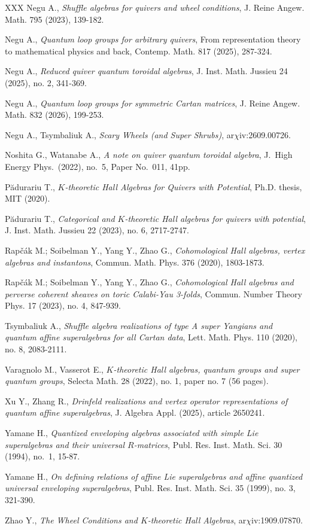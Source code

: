 \documentclass{amsart}
\begin{document}
\begin{thebibliography}{XXX}
Negu A.,
{\em Shuffle algebras for quivers and wheel conditions},
J. Reine Angew. Math. 795 (2023), 139-182.

Negu A.,
{\em Quantum loop groups for arbitrary quivers}, 
From representation theory to mathematical physics and back, Contemp. Math. 817 (2025), 287-324.

Negu A.,
{\em Reduced quiver quantum toroidal algebras},
J. Inst. Math. Jussieu 24 (2025), no. 2, 341-369.

Negu A.,
{\em Quantum loop groups for symmetric Cartan matrices},
J. Reine Angew. Math. 832 (2026), 199-253.

Negu A., Tsymbaliuk A.,
{\em Scary Wheels (and Super Shrubs)},
ar$\chi$iv:2609.00726.

Noshita G., Watanabe A., 
{\em A note on quiver quantum toroidal algebra}, 
J.\ High Energy Phys.\ (2022), no.~5, Paper No.~011, 41pp.

Pădurariu T.,
{\em $K$-theoretic Hall Algebras for Quivers with Potential},
Ph.D. thesis, MIT (2020).

Pădurariu T.,
{\em Categorical and $K$-theoretic Hall algebras for quivers with potential}, 
J. Inst. Math. Jussieu 22 (2023), no. 6, 2717-2747.

Rapčák M.; Soibelman Y., Yang Y., Zhao G.,
{\em Cohomological Hall algebras, vertex algebras and instantons},
Commun. Math. Phys. 376 (2020), 1803-1873.

Rapčák M.; Soibelman Y., Yang Y., Zhao G.,
{\em Cohomological Hall algebras and perverse coherent sheaves on toric Calabi-Yau 3-folds},
Commun. Number Theory Phys.  17 (2023), no. 4, 847-939.

Tsymbaliuk A.,
{\em Shuffle algebra realizations of type A super Yangians and quantum affine superalgebras for all Cartan data}, 
Lett. Math. Phys. 110 (2020), no. 8, 2083-2111.

Varagnolo M., Vasserot E., 
{\em $K$-theoretic Hall algebras, quantum groups and super quantum groups},
Selecta Math. 28 (2022), no. 1, paper no. 7 (56 pages).

Xu Y., Zhang R., 
{\em Drinfeld realizations and vertex operator representations of quantum affine superalgebras}, 
J. Algebra Appl. (2025), article 2650241.

Yamane H.,
{\em Quantized enveloping algebras associated with simple Lie superalgebras and their universal $R$-matrices}, 
Publ. Res. Inst. Math. Sci. 30 (1994), no.~1, 15-87.

Yamane H., 
{\em On defining relations of affine Lie superalgebras and affine quantized universal enveloping superalgebras}, 
Publ. Res. Inst. Math. Sci. 35 (1999), no. 3, 321-390.

Zhao Y., 
{\em The Wheel Conditions and $K$-theoretic Hall Algebras}, ar$\chi$iv:1909.07870.

\end{thebibliography}
\end{document}
